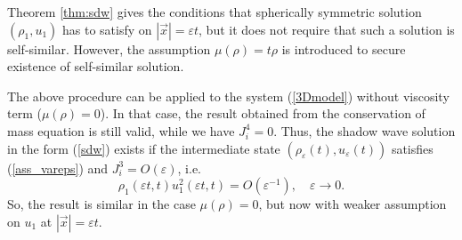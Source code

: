 \documentclass[reqno]{article}%
\theoremstyle{plain}
\theoremstyle{definition}
\theoremstyle{remark}
\newtheorem{remark}{Remark}[section]
\numberwithin{equation}{section}
\begin{document}
\medskip

Theorem \ref{thm:sdw} gives the conditions that spherically symmetric solution $(\rho_1,u_1)$  has to satisfy on $|\vec{x}|=\varepsilon t$, but it does not require that such a solution is self-similar. However, the assumption  $\mu(\rho)=t\rho$ is introduced to secure existence of self-similar solution.



\medskip

The above procedure can be applied to the system (\ref{3Dmodel}) without viscosity term ($\mu(\rho)=0$). In that case, the result obtained from the conservation of mass equation is still valid, while we have $J_i^4=0$. Thus, the shadow wave solution in the form (\ref{sdw}) exists if the intermediate state $(\rho_\varepsilon(t), u_\varepsilon(t))$ satisfies (\ref{ass_vareps}) and $J_i^3=O(\varepsilon)$,  i.e.\ 
\[\rho_1(\varepsilon t,t)u_1^2(\varepsilon t,t)=O(\varepsilon^{-1}),\quad\varepsilon\to 0.\] 
So, the result is similar in the case $\mu(\rho)=0$, but now with weaker assumption on $u_1$ at $|\vec{x}|=\varepsilon t$.
\end{document}
